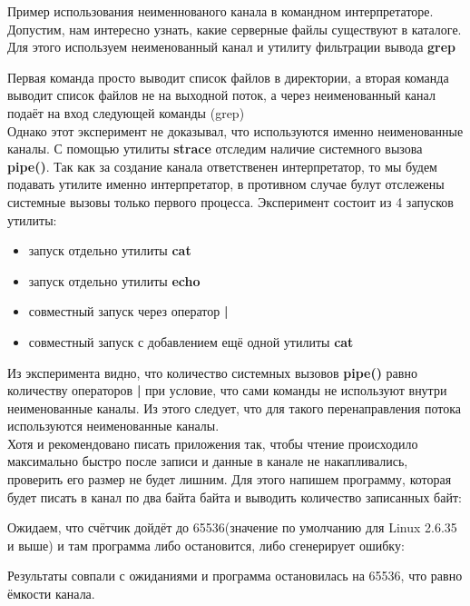 \documentclass[a4paper]{article}
\begin{document}
	Пример использования неименнованого канала в командном интерпретаторе. Допустим, нам интересно узнать, какие серверные файлы существуют в каталоге. Для этого используем неименованный канал и утилиту фильтрации вывода \textbf{grep}
	
	Первая команда просто выводит список файлов в директории, а вторая команда выводит список файлов не на выходной поток, а через неименованный канал подаёт на вход следующей команды (grep)\\
	
	Однако этот эксперимент не доказывал, что используются именно неименованные каналы. С помощью утилиты \textbf{strace} отследим наличие системного вызова \textbf{pipe()}. Так как за создание канала ответственен интерпретатор, то мы будем подавать утилите именно интерпретатор, в противном случае булут отслежены системные вызовы только первого процесса. Эксперимент состоит из 4 запусков утилиты:
	\begin{itemize}
		\item запуск отдельно утилиты \textbf{cat}
		\item запуск отдельно утилиты \textbf{echo}
		\item совместный запуск через оператор \textbf{|}
		\item совместный запуск с добавлением ещё одной утилиты \textbf{cat}
	\end{itemize}	 
	
	
	
	Из эксперимента видно, что количество системных вызовов \textbf{pipe()} равно количеству операторов \textbf{|} при условие, что сами команды не используют внутри неименованные каналы. Из этого следует, что для такого перенаправления потока используются неименованные каналы.\\
	
	Хотя и рекомендовано писать приложения так, чтобы чтение происходило максимально быстро после записи и данные в канале не накапливались, проверить его размер не будет лишним. Для этого напишем программу, которая будет писать в канал по два байта байта и выводить количество записанных байт:
	
	
	
	Ожидаем, что счётчик дойдёт до 65536(значение по умолчанию для Linux 2.6.35 и выше) и там программа либо остановится, либо сгенерирует ошибку:
	
	Результаты совпали с ожиданиями и программа остановилась на 65536, что равно ёмкости канала.\\
	
\end{document}
